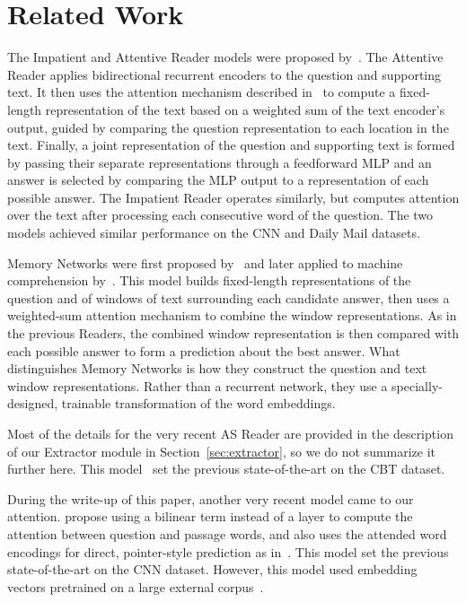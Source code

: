 \documentclass[11pt,letterpaper]{article}
\begin{document}
\section{Related Work}
\label{sec:related}
The Impatient and Attentive Reader models were proposed by~. The Attentive Reader applies bidirectional recurrent encoders to the question and supporting text. It then uses the attention mechanism described in~ to compute a fixed-length representation of the text based on a weighted sum of the text encoder's output, guided by comparing the question representation to each location in the text. Finally, a joint representation of the question and supporting text is formed by passing their separate representations through a feedforward MLP and an answer is selected by comparing the MLP output to a representation of each possible answer. The Impatient Reader operates similarly, but computes attention over the text after processing each consecutive word of the question. The two models achieved similar performance on the CNN and Daily Mail datasets.

Memory Networks were first proposed by~ and later applied to machine comprehension by~. This model builds fixed-length representations of the question and of windows of text surrounding each candidate answer, then uses a weighted-sum attention mechanism to combine the window representations. As in the previous Readers, the combined window representation is then compared with each possible answer to form a prediction about the best answer. What distinguishes Memory Networks is how they construct the question and text window representations. Rather than a recurrent network, they use a specially-designed, trainable transformation of the word embeddings.

Most of the details for the very recent AS Reader are provided in the description of our Extractor module in Section~\ref{sec:extractor}, so we do not summarize it further here. This model~\cite{kadlec2016} set the previous state-of-the-art on the CBT dataset.

During the write-up of this paper, another very recent model came to our attention.  propose using a bilinear term instead of a  layer to compute the attention between question and passage words, and also uses the attended word encodings for direct, pointer-style prediction as in~. This model set the previous state-of-the-art on the CNN dataset. However, this model used embedding vectors pretrained on a large external corpus~\cite{pennington2014}.
\end{document}
